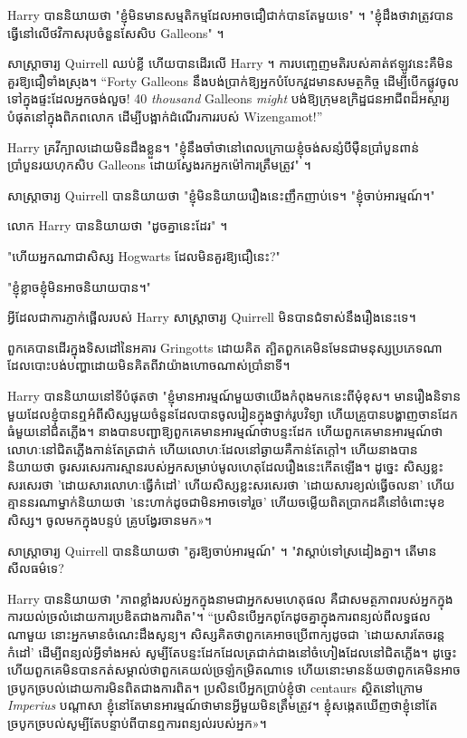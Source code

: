 {{Harry បាននិយាយថា "ខ្ញុំមិនមានសម្មតិកម្មដែលអាចជឿជាក់បានតែមួយទេ" ។ "ខ្ញុំដឹងថាវាត្រូវបានធ្វើនៅលើថវិកាសរុបចំនួនសែសិប Galleons" ។

សាស្រ្តាចារ្យ Quirrell ឈប់ខ្លី ហើយបានដើរលើ Harry ។ ការបញ្ចេញមតិរបស់គាត់ឥឡូវនេះគឺមិនគួរឱ្យជឿទាំងស្រុង។ “Forty Galleons នឹងបង់ប្រាក់ឱ្យអ្នកបំបែកវួដមានសមត្ថកិច្ច ដើម្បីបើកផ្លូវចូលទៅក្នុងផ្ទះដែលអ្នកចង់លួច! 40 \emph{thousand} Galleons \emph{might} បង់ឱ្យក្រុមឧក្រិដ្ឋជនអាជីពដ៏អស្ចារ្យបំផុតនៅក្នុងពិភពលោក ដើម្បីបង្អាក់ដំណើរការរបស់ Wizengamot!”

Harry គ្រវីក្បាលដោយមិនដឹងខ្លួន។ "ខ្ញុំនឹងចាំថានៅពេលក្រោយខ្ញុំចង់សន្សំបីម៉ឺនប្រាំបួនពាន់ប្រាំបួនរយហុកសិប Galleons ដោយស្វែងរកអ្នកម៉ៅការត្រឹមត្រូវ" ។

សាស្រ្តាចារ្យ Quirrell បាននិយាយថា "ខ្ញុំមិននិយាយរឿងនេះញឹកញាប់ទេ។ "ខ្ញុំចាប់អារម្មណ៍។"

លោក Harry បាននិយាយថា "ដូចគ្នានេះដែរ" ។

"ហើយអ្នកណាជាសិស្ស Hogwarts ដែលមិនគួរឱ្យជឿនេះ?"

"ខ្ញុំខ្លាចខ្ញុំមិនអាចនិយាយបាន។"

អ្វី​ដែល​ជា​ការ​ភ្ញាក់​ផ្អើល​របស់ Harry សាស្ត្រាចារ្យ Quirrell មិន​បាន​ជំទាស់​នឹង​រឿង​នេះ​ទេ។

ពួកគេបានដើរក្នុងទិសដៅនៃអគារ Gringotts ដោយគិត ត្បិតពួកគេមិនមែនជាមនុស្សប្រភេទណាដែលបោះបង់បញ្ហាដោយមិនគិតពីវាយ៉ាងហោចណាស់ប្រាំនាទី។

Harry បាននិយាយនៅទីបំផុតថា "ខ្ញុំមានអារម្មណ៍មួយថាយើងកំពុងមកនេះពីមុំខុស។ មានរឿងនិទានមួយដែលខ្ញុំបានឮអំពីសិស្សមួយចំនួនដែលបានចូលរៀនក្នុងថ្នាក់រូបវិទ្យា ហើយគ្រូបានបង្ហាញចានដែកធំមួយនៅជិតភ្លើង។ នាងបានបញ្ជាឱ្យពួកគេមានអារម្មណ៍ថាបន្ទះដែក ហើយពួកគេមានអារម្មណ៍ថាលោហៈនៅជិតភ្លើងកាន់តែត្រជាក់ ហើយលោហៈដែលនៅឆ្ងាយគឺកាន់តែក្តៅ។ ហើយនាងបាននិយាយថា ចូរសរសេរការស្មានរបស់អ្នកសម្រាប់មូលហេតុដែលរឿងនេះកើតឡើង។ ដូច្នេះ សិស្សខ្លះសរសេរថា 'ដោយសារលោហៈធ្វើកំដៅ' ហើយសិស្សខ្លះសរសេរថា 'ដោយសារខ្យល់ធ្វើចលនា' ហើយគ្មាននរណាម្នាក់និយាយថា 'នេះហាក់ដូចជាមិនអាចទៅរួច' ហើយចម្លើយពិតប្រាកដគឺនៅចំពោះមុខសិស្ស។ ចូល​មក​ក្នុង​បន្ទប់ គ្រូ​បង្វែរ​ចាន​មក»។

សាស្រ្តាចារ្យ Quirrell បាននិយាយថា "គួរឱ្យចាប់អារម្មណ៍" ។ "វាស្តាប់ទៅស្រដៀងគ្នា។ តើមានសីលធម៌ទេ?

Harry បាននិយាយថា "ភាពខ្លាំងរបស់អ្នកក្នុងនាមជាអ្នកសមហេតុផល គឺជាសមត្ថភាពរបស់អ្នកក្នុងការយល់ច្រលំដោយការប្រឌិតជាងការពិត"។ “ប្រសិនបើអ្នកពូកែដូចគ្នាក្នុងការពន្យល់ពីលទ្ធផលណាមួយ នោះអ្នកមានចំណេះដឹងសូន្យ។ សិស្សគិតថាពួកគេអាចប្រើពាក្យដូចជា 'ដោយសារតែចរន្តកំដៅ' ដើម្បីពន្យល់អ្វីទាំងអស់ សូម្បីតែបន្ទះដែកដែលត្រជាក់ជាងនៅចំហៀងដែលនៅជិតភ្លើង។ ដូច្នេះ​ហើយ​ពួកគេ​មិន​បាន​កត់​សម្គាល់​ថា​ពួកគេ​យល់​ច្រឡំ​កម្រិត​ណា​ទេ ហើយ​នោះ​មាន​ន័យ​ថា​ពួកគេ​មិន​អាច​ច្របូកច្របល់​ដោយ​ការ​មិន​ពិត​ជាង​ការពិត។ ប្រសិនបើអ្នកប្រាប់ខ្ញុំថា centaurs ស្ថិតនៅក្រោម \emph{Imperius} បណ្តាសា ខ្ញុំនៅតែមានអារម្មណ៍ថាមានអ្វីមួយមិនត្រឹមត្រូវ។ ខ្ញុំ​សង្កេត​ឃើញ​ថា​ខ្ញុំ​នៅ​តែ​ច្របូកច្របល់​សូម្បី​តែ​បន្ទាប់​ពី​បាន​ឮ​ការ​ពន្យល់​របស់​អ្នក»។

}}
